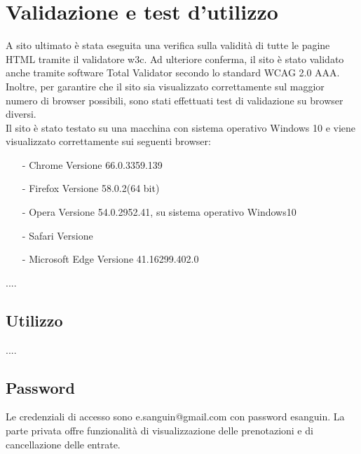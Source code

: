 \section{Validazione e test d'utilizzo}
A sito ultimato è stata eseguita una verifica sulla validità di tutte le pagine HTML tramite il validatore w3c. Ad ulteriore conferma, il sito è stato validato anche tramite software Total Validator secondo lo standard WCAG 2.0 AAA.
Inoltre, per garantire che il sito sia visualizzato correttamente sul maggior numero di browser possibili, sono stati effettuati test di validazione su browser diversi.
\\
Il sito è stato testato su una macchina con sistema operativo Windows 10 e viene visualizzato correttamente sui seguenti browser:
\begin{itemize}
	\item [-] Chrome Versione 66.0.3359.139
	\item [-] Firefox Versione 58.0.2(64 bit)
	\item [-] Opera Versione 54.0.2952.41, su sistema operativo Windows10
	\item [-] Safari Versione
	\item [-] Microsoft Edge Versione 41.16299.402.0
\end{itemize}
....
\subsection{Utilizzo}
....
\subsection{Password}
Le credenziali di accesso sono  e.sanguin@gmail.com  con password esanguin. La parte privata offre funzionalità di visualizzazione delle prenotazioni e di cancellazione delle entrate. 
